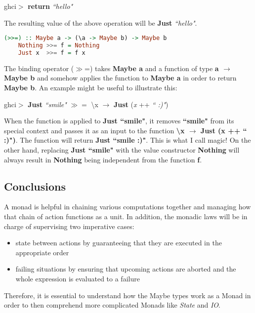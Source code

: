 \documentclass[a4paper, onecolumn]{article}
\begin{document}
\begin{center}
    ghci$>$ \textbf{return} \textit{``hello"}
\end{center}
The resulting value of the above operation will be \textbf{Just} \textit{``hello"}.
\begin{tcolorbox}
\begin{lstlisting}[language=Haskell]
    (>>=) :: Maybe a -> (\a -> Maybe b) -> Maybe b
    Nothing >>= f = Nothing
    Just x  >>= f = f x
\end{lstlisting}
\end{tcolorbox}
The binding operator ($\gg$=) takes \textbf{Maybe a} and a function of type \textbf{a $\rightarrow$ Maybe b} and somehow applies the function to \textbf{Maybe a} in order to return \textbf{Maybe b}. An example might be useful to illustrate this: 
\begin{center}
ghci$>$ \textbf{Just} \textit{``smile"} $\gg=$ \textbackslash x $\rightarrow$ \textbf{Just} (\textit{x} ++ \textit{`` :)"})
\end{center}
When the function is applied to \textbf{Just ``smile"}, it removes \textbf{``smile"} from its special context and passes it as an input to the function \textbf{\textbackslash x $\rightarrow$ Just (x ++ `` :)")}.  The function will return \textbf{Just ``smile :)"}. This is what I call magic! On the other hand, replacing \textbf{Just ``smile"} with the value constructor \textbf{Nothing} will always result in \textbf{Nothing} being independent from the function \textbf{f}.


\subsection{Conclusions}
A monad is helpful in chaining various computations together and managing how that chain of action functions as a unit. In addition, the monadic laws will be in charge of supervising two imperative cases:

\begin{itemize}
    \item state between actions by guaranteeing that they are executed in the appropriate order 
    \item failing situations by ensuring that upcoming actions are aborted and the whole expression is evaluated to a failure
\end{itemize}
Therefore, it is essential to understand how the Maybe types work as a Monad in order to then comprehend more complicated Monads like \textit{State} and \textit{IO}.
\end{document}
